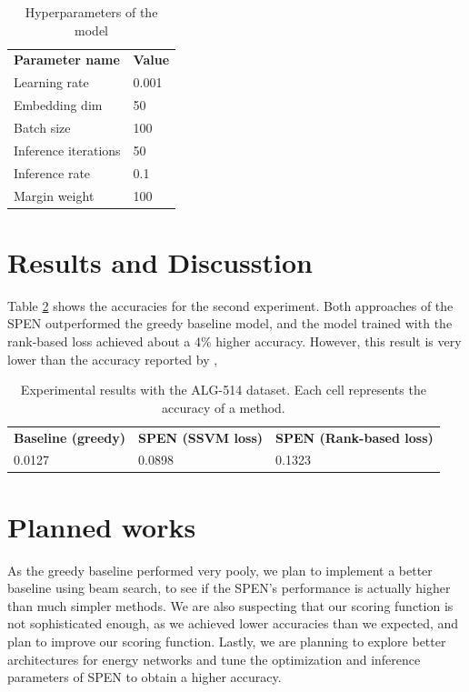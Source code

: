 \documentclass[11pt,letterpaper]{article}
\begin{document}
%
\begin{table}[]
\centering
\caption{Hyperparameters of the model}
\label{params}
\begin{tabular}{ll}
\textbf{Parameter name} & \textbf{Value} \\
Learning rate           & 0.001          \\
Embedding dim           & 50             \\
Batch size              & 100            \\
Inference iterations    & 50             \\
Inference rate          & 0.1            \\
Margin weight           & 100           
\end{tabular}
\end{table}
\section{Results and Discusstion}
Table \ref{result} shows the accuracies for the second experiment. Both approaches of the SPEN outperformed the greedy baseline model, and the model trained with the rank-based loss achieved about a 4\% higher accuracy. However, this result is very lower than the accuracy reported by \cite{Kushman2014LearningTA},
\begin{table}[]
\centering
\caption{Experimental results with the ALG-514 dataset. Each cell represents the accuracy of a method.}
\label{result}
\begin{tabular}{lll}
\textbf{Baseline (greedy)} & \textbf{SPEN (SSVM loss)} & \textbf{SPEN (Rank-based loss)} \\
0.0127                     & 0.0898                    & 0.1323                         
\end{tabular}
\end{table}
\section{Planned works}
As the greedy baseline performed very pooly, we plan to implement a better baseline using beam search, to see if the SPEN's performance is actually higher than much simpler methods. We are also suspecting that our scoring function is not sophisticated enough, as we achieved lower accuracies than we expected, and plan to improve our scoring function. Lastly, we are planning to explore better architectures for energy networks and tune the optimization and inference parameters of SPEN to obtain a higher accuracy.
\end{document}
